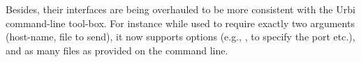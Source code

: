 Besides, their interfaces are being overhauled to be more consistent with
the Urbi command-line tool-box.  For instance while  used
to require exactly two arguments (host-name, file to send), it now supports
options (e.g., ,  to specify the port etc.),
and as many files as provided on the command line.


